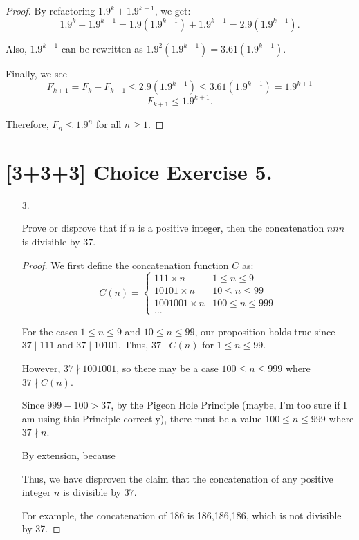 \documentclass{article}
\begin{document}
\begin{enumerate}
{\begin{proof}
            By refactoring \(1.9^k + 1.9^{k-1}\), we get:
            \[1.9^k + 1.9^{k-1} = 1.9(1.9^{k-1}) + 1.9^{k-1} = 2.9(1.9^{k-1}).\]

            Also, \(1.9^{k+1}\) can be rewritten as \(1.9^2 (1.9^{k-1}) = 3.61(1.9^{k-1})\).

            Finally, we see
            \[F_{k+1} = F_k + F_{k-1} \le 2.9(1.9^{k-1}) \le 3.61(1.9^{k-1}) = 1.9^{k+1}\]
            \[F_{k+1} \le 1.9^{k+1}.\]

            Therefore, \(F_n \le 1.9^n\) for all \(n \ge 1\).
        \end{proof}
    }
\end{enumerate}

\section*{[3+3+3] Choice Exercise 5.}

\begin{enumerate}
    \item[3.] {
        Prove or disprove that if \(n\) is a positive integer, then the concatenation 
        \(nnn\) is divisible by \(37\). 

        \begin{proof}
            We first define the concatenation function \(C\) as: 
            \[C(n) = \begin{cases}
                111 \times n & 1 \le n \le 9 \\
                10101 \times n & 10 \le n \le 99 \\
                1001001 \times n & 100 \le n \le 999 \\
                ...

            \end{cases}\]

            For the cases \(1 \le n \le 9\) and \(10 \le n \le 99\), our proposition 
            holds true since \(37 \mid 111\) and \(37 \mid 10101\). Thus, \(37 \mid C(n)\)
            for \(1 \le n \le 99\).

            However, \(37 \nmid 1001001\), so there may be a case \(100 \le n \le 999\) 
            where \(37 \nmid C(n)\). 

            Since \(999 - 100 > 37\), by the Pigeon Hole Principle (maybe, I'm 
            too sure if I am using this Principle correctly), there must be a 
            value \(100 \le n \le 999\) where \(37 \nmid n\). 

            By extension, because 

            Thus, we have disproven the claim that the concatenation of any positive
            integer \(n\) is divisible by \(37\). 

            For example, the concatenation of 186 is 186,186,186, which is not 
            divisible by 37.
        \end{proof}
    }
\end{enumerate}
\end{document}
